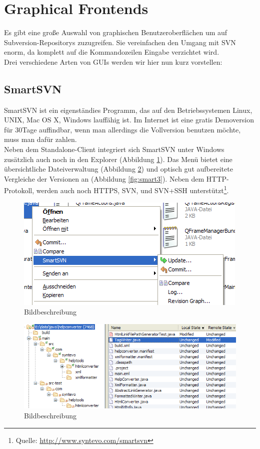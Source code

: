 \section{Graphical Frontends}
Es gibt eine große Auswahl von graphischen Benutzeroberflächen um auf Subversion-Repositorys zuzugreifen. Sie vereinfachen den Umgang mit SVN enorm, da komplett auf die Kommandozeilen Eingabe verzichtet wird.\\
Drei verschiedene Arten von GUIs werden wir hier nun kurz  vorstellen:
\subsection{SmartSVN}
SmartSVN ist ein eigenständies Programm, das auf den Betriebssystemen Linux, UNIX, Mac OS X, Windows lauffähig ist. Im Internet ist eine gratis Demoversion für 30Tage auffindbar, wenn man allerdings die Vollversion benutzen möchte, muss man dafür zahlen.\\
Neben dem Standalone-Client integriert sich SmartSVN unter Windows zusätzlich auch noch in den Explorer (Abbildung \ref{fig:smart1}). Das Menü bietet eine übersichtliche Dateiverwaltung (Abbildung \ref{fig:smart2}) und optisch gut aufbereitete Vergleiche der Versionen an (Abbildung \ref{fig:smart3}).
Neben dem HTTP-Protokoll, werden auch noch HTTPS, SVN, und SVN+SSH unterstützt\footnote{Quelle: \url{http://www.syntevo.com/smartsvn}}.
\begin{figure}[!htb]
	\centering
	\includegraphics[width=.8\textwidth]{1_smartsvn1.png}
	\caption{Bildbeschreibung}
	\label{fig:smart1}
\end{figure}  
\begin{figure}[!htb]
	\centering
	\includegraphics[width=.9\textwidth]{2_smartsvn2.png}
	\caption{Bildbeschreibung}
	\label{fig:smart2}
\end{figure}  
